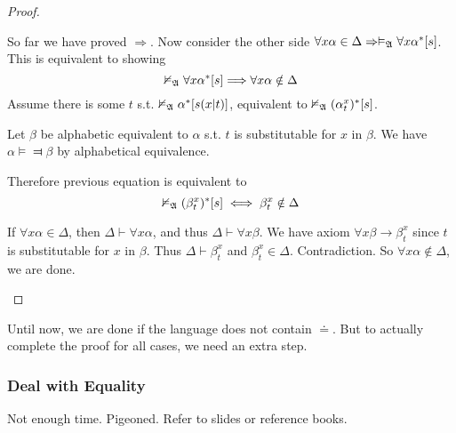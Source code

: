 \begin{proof}
\begin{itemize}
        So far we have proved $\Rightarrow$. Now consider the other side $\forall{x}\alpha\in\Delta\Rightarrow\vDash_{\mathfrak{A}}\forall{x}\alpha^*[s]$. This is equivalent to showing
        \[ \nvDash_{\mathfrak{A}}\forall{x}\alpha^*[s] \Longrightarrow \forall{x}\alpha\notin\Delta \]
        Assume there is some $t$ s.t. $\nvDash_{\mathfrak{A}}\alpha^*[s(x|t)]$, equivalent to $\nvDash_{\mathfrak{A}}(\alpha_t^x)^*[s]$.
        
        Let $\beta$ be alphabetic equivalent to $\alpha$ s.t. $t$ is substitutable for $x$ in $\beta$. We have $\alpha\vDash\Dashv\beta$ by alphabetical equivalence.

        Therefore previous equation is equivalent to
        \[ \nvDash_{\mathfrak{A}}(\beta_t^x)^*[s] \iff \beta_t^x \notin \Delta \]

        If $\forall{x}\alpha\in\Delta$, then $\Delta\vdash\forall{x}\alpha$, and thus $\Delta\vdash\forall{x}\beta$. We have axiom $\forall{x}\beta\to\beta_t^x$ since $t$ is substitutable for $x$ in $\beta$. Thus $\Delta\vdash\beta_t^x$ and $\beta_t^x\in\Delta$. Contradiction. So $\forall{x}\alpha\notin\Delta$, we are done.
    \end{itemize}
\end{proof}

Until now, we are done if the language does not contain $\doteq$. But to actually complete the proof for all cases, we need an extra step.

\subsubsection{Deal with Equality}

Not enough time. Pigeoned. Refer to slides or reference books.

